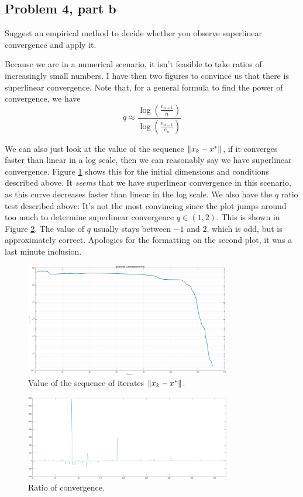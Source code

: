 \subsection{Problem 4, part b}
Suggest an empirical method to decide whether you observe superlinear convergence and apply it. 
\partbreak
\begin{solution}

    Because we are in a numerical scenario, it isn't feasible to take ratios of increasingly small numbers. I have then two figures to convince us that there is superlinear convergence. Note that, for a general formula to find the power of convergence, we have
    \[q \approx \frac{\log \left( \frac{e_{n+1}}{n}\right)}{\log \left( \frac{e_{n-1}}{e_n}\right)}\]

    We can also just look at the value of the sequence $\norm{x_k - x^*}$, if it converges faster than linear in a log scale, then we can reasonably say we have superlinear convergence. Figure \ref{fig:sup-conv} shows this for the initial dimensions and conditions described above. It \textit{seems} that we have superlinear convergence in this scenario, as this curve decreases faster than linear in the log scale. We also have the $q$ ratio test described above: It's not the most convincing since the plot jumps around too much to determine superlinear convergence $q \in (1, 2)$. This is shown in Figure \ref{fig:sup-conv2}. The value of $q$ usually stays between $-1$ and $2$, which is odd, but is approximately correct. Apologies for the formatting on the second plot, it was a last minute inclusion. 
\end{solution}

\vspace{15mm}
\begin{figure}[!ht]
    \centering
    \includegraphics[width=0.8\textwidth]{Plots/sup_conv.png}
    \caption{Value of the sequence of iterates $\norm{x_k - x^*}$.}
    \label{fig:sup-conv}
\end{figure}

\clearpage
\begin{figure}[!h]
    \centering
    \includegraphics[width = 0.8\textwidth]{Plots/sup_conv2.png}
    \caption{Ratio of convergence.}
    \label{fig:sup-conv2}
\end{figure}
